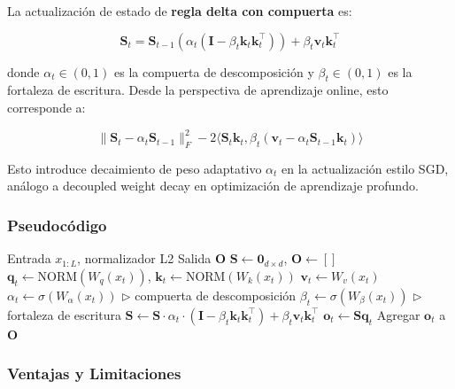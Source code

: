 \documentclass[11pt,a4paper]{article}
\begin{document}
La actualización de estado de \textbf{regla delta con compuerta} es:

\begin{equation}
\mathbf{S}_t = \mathbf{S}_{t-1} \left(\alpha_t (\mathbf{I} - \beta_t \mathbf{k}_t \mathbf{k}_t^\top)\right) + \beta_t \mathbf{v}_t \mathbf{k}_t^\top
\end{equation}

donde $\alpha_t \in (0,1)$ es la compuerta de descomposición y $\beta_t \in (0,1)$ es la fortaleza de escritura. Desde la perspectiva de aprendizaje online, esto corresponde a:

\begin{equation}
\|\mathbf{S}_t - \alpha_t \mathbf{S}_{t-1}\|_F^2 - 2\langle \mathbf{S}_t \mathbf{k}_t, \beta_t(\mathbf{v}_t - \alpha_t \mathbf{S}_{t-1} \mathbf{k}_t)\rangle
\end{equation}

Esto introduce decaimiento de peso adaptativo $\alpha_t$ en la actualización estilo SGD, análogo a decoupled weight decay en optimización de aprendizaje profundo.

\subsubsection{Pseudocódigo}

\begin{algorithm}
\caption{Gated DeltaNet - Regla Delta Compuertada}
\begin{algorithmic}[1]
\Require Entrada $x_{1:L}$, normalizador L2
\Ensure Salida $\mathbf{O}$
\State $\mathbf{S} \gets \mathbf{0}_{d \times d}$, $\mathbf{O} \gets []$
    \State $\mathbf{q}_t \gets \text{NORM}(W_q(x_t))$, $\mathbf{k}_t \gets \text{NORM}(W_k(x_t))$
    \State $\mathbf{v}_t \gets W_v(x_t)$
    \State $\alpha_t \gets \sigma(W_\alpha(x_t))$ \quad $\triangleright$ compuerta de descomposición
    \State $\beta_t \gets \sigma(W_\beta(x_t))$ \quad $\triangleright$ fortaleza de escritura
    \State $\mathbf{S} \gets \mathbf{S} \cdot \alpha_t \cdot (\mathbf{I} - \beta_t \mathbf{k}_t \mathbf{k}_t^\top) + \beta_t \mathbf{v}_t \mathbf{k}_t^\top$
    \State $\mathbf{o}_t \gets \mathbf{S} \mathbf{q}_t$
    \State Agregar $\mathbf{o}_t$ a $\mathbf{O}$
\EndFor
\end{algorithmic}
\end{algorithm}

\subsubsection{Ventajas y Limitaciones}
\end{document}
